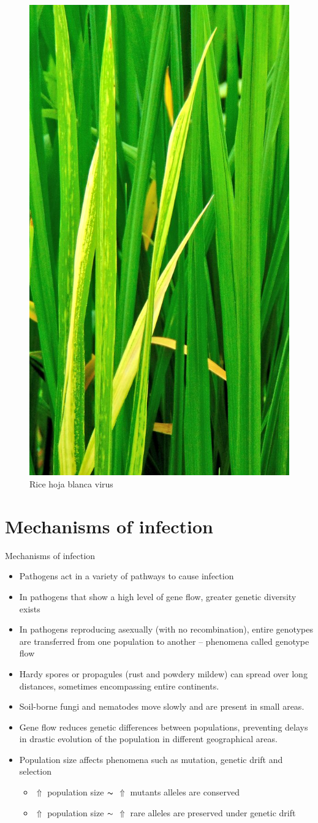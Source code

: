 \documentclass[10pt,dvipsnames,ignorenonframetext,aspectratio=169]{beamer}
\providecommand{\tightlist}{%
  \setlength{\itemsep}{0pt}\setlength{\parskip}{0pt}}
\begin{document}
\begin{frame}{}
\protect\hypertarget{section-17}{}
\begin{figure}
\includegraphics[width=0.25\linewidth]{../images/rice_hoja_blanca_virus} \caption{Rice hoja blanca virus}\label{fig:rice-hoja-blanca-virus}
\end{figure}
\end{frame}

\hypertarget{mechanisms-of-infection}{%
\section{Mechanisms of infection}\label{mechanisms-of-infection}}

\begin{frame}{Mechanisms of infection}
\footnotesize

\begin{itemize}
\tightlist
\item
  Pathogens act in a variety of pathways to cause infection
\item
  In pathogens that show a high level of gene flow, greater genetic
  diversity exists
\item
  In pathogens reproducing asexually (with no recombination), entire
  genotypes are transferred from one population to another -- phenomena
  called genotype flow
\item
  Hardy spores or propagules (rust and powdery mildew) can spread over
  long distances, sometimes encompassing entire continents.
\item
  Soil-borne fungi and nematodes move slowly and are present in small
  areas.
\item
  Gene flow reduces genetic differences between populations, preventing
  delays in drastic evolution of the population in different
  geographical areas.
\item
  Population size affects phenomena such as mutation, genetic drift and
  selection

  \begin{itemize}
  \footnotesize
  \item $\Uparrow$ population size $\thicksim$ $\Uparrow$ mutants alleles are conserved
  \item $\Uparrow$ population size $\thicksim$ $\Uparrow$ rare alleles are preserved under genetic drift 
  \end{itemize}
\end{itemize}
\end{frame}
\end{document}
